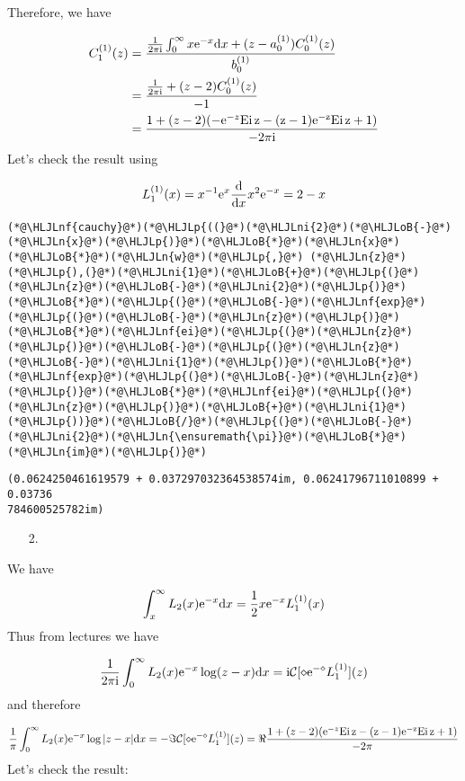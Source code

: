 \documentclass[12pt,landscape]{article}
\newcommand{\HLJLn}[1]{#1}
\newcommand{\HLJLnf}[1]{\textcolor[RGB]{66,102,213}{#1}}
\newcommand{\HLJLni}[1]{\textcolor[RGB]{59,151,46}{#1}}
\newcommand{\HLJLoB}[1]{\textcolor[RGB]{102,102,102}{\textbf{#1}}}
\newcommand{\HLJLp}[1]{#1}
\def\D{ {\rm d} }
\def\I{ {\rm i} }
\def\E{ {\rm e} }
\def\CC{ {\cal C} }
\def\Ei{ {\rm Ei}\, }
\def\dx{\D x}
\def\Ei{\rm Ei\,}
\begin{document}
{Therefore, we have


\begin{align*}
C_1^{(1)}(z) &= {{1 \over 2 \pi \I} \int_0^\infty x \E^{-x} \dx + (z-a_0^{(1)}) C_0^{(1)}(z) \over b_0^{(1)}} \\
&=  {{1 \over 2 \pi \I}  + (z-2) C_0^{(1)}(z) \over -1}\\
&=  {1  + (z-2) (-\E^{-z} \Ei z - (z-1) \E^{-z} \Ei z +1) \over -2 \pi \I}
\end{align*}
Let's check the result using

\[
L_1^{(1)}(x) = x^{-1} \E^x {\D \over \dx} x^2 \E^{-x} = 2 - x
\]

\begin{lstlisting}
(*@\HLJLnf{cauchy}@*)(*@\HLJLp{((}@*)(*@\HLJLni{2}@*)(*@\HLJLoB{-}@*)(*@\HLJLn{x}@*)(*@\HLJLp{)}@*)(*@\HLJLoB{*}@*)(*@\HLJLn{x}@*)(*@\HLJLoB{*}@*)(*@\HLJLn{w}@*)(*@\HLJLp{,}@*) (*@\HLJLn{z}@*)(*@\HLJLp{),(}@*)(*@\HLJLni{1}@*)(*@\HLJLoB{+}@*)(*@\HLJLp{(}@*)(*@\HLJLn{z}@*)(*@\HLJLoB{-}@*)(*@\HLJLni{2}@*)(*@\HLJLp{)}@*)(*@\HLJLoB{*}@*)(*@\HLJLp{(}@*)(*@\HLJLoB{-}@*)(*@\HLJLnf{exp}@*)(*@\HLJLp{(}@*)(*@\HLJLoB{-}@*)(*@\HLJLn{z}@*)(*@\HLJLp{)}@*)(*@\HLJLoB{*}@*)(*@\HLJLnf{ei}@*)(*@\HLJLp{(}@*)(*@\HLJLn{z}@*)(*@\HLJLp{)}@*)(*@\HLJLoB{-}@*)(*@\HLJLp{(}@*)(*@\HLJLn{z}@*)(*@\HLJLoB{-}@*)(*@\HLJLni{1}@*)(*@\HLJLp{)}@*)(*@\HLJLoB{*}@*)(*@\HLJLnf{exp}@*)(*@\HLJLp{(}@*)(*@\HLJLoB{-}@*)(*@\HLJLn{z}@*)(*@\HLJLp{)}@*)(*@\HLJLoB{*}@*)(*@\HLJLnf{ei}@*)(*@\HLJLp{(}@*)(*@\HLJLn{z}@*)(*@\HLJLp{)}@*)(*@\HLJLoB{+}@*)(*@\HLJLni{1}@*)(*@\HLJLp{))}@*)(*@\HLJLoB{/}@*)(*@\HLJLp{(}@*)(*@\HLJLoB{-}@*)(*@\HLJLni{2}@*)(*@\HLJLn{\ensuremath{\pi}}@*)(*@\HLJLoB{*}@*)(*@\HLJLn{im}@*)(*@\HLJLp{)}@*)
\end{lstlisting}

\begin{lstlisting}
(0.0624250461619579 + 0.037297032364538574im, 0.06241796711010899 + 0.03736
784600525782im)
\end{lstlisting}


\begin{itemize}
\item[2. ] \end{itemize}
We have

\[
\int_x^\infty L_2(x) \E^{-x} \dx = {1 \over 2} x \E^{-x} L_1^{(1)}(x)
\]
Thus from lectures we have

\[
{1 \over 2 \pi\I} \int_0^\infty L_2(x) \E^{-x} \log(z-x) \dx = \I\CC[ \diamond \E^{-\diamond} L_1^{(1)}](z)
\]
and therefore

\[
{1 \over \pi} \int_0^\infty L_2(x) \E^{-x} \log|z-x| \dx  = -\Im \CC[ \diamond \E^{-\diamond} L_1^{(1)}](z) = \Re{1  + (z-2) (\E^{-z} \Ei z - (z-1) \E^{-z} \Ei z +1) \over -2 \pi }
\]
Let's check the result:


}
\end{document}
